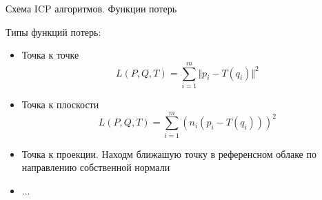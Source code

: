 \documentclass[6pt,pdf,utf8,russian]{beamer}
\begin{document}
\begin{frame}[fragile]{Схема ICP алгоритмов. Функции потерь}
    \begin{block}{}
        Типы функций потерь:
        \begin{itemize}
            \item Точка к точке \[L(P,Q,T)=\sum_{i=1}^m\Vert p_i - T(q_i)\Vert^2 \]
            \item Точка к плоскости \[L(P,Q,T)=\sum_{i=1}^m(n_i (p_i - T(q_i)))^2 \]
            \item Точка к проекции. Находм ближашую точку в референсном облаке по направлению собственной нормали
            \item ...
        \end{itemize}
    \end{block}
\end{frame}
\end{document}

